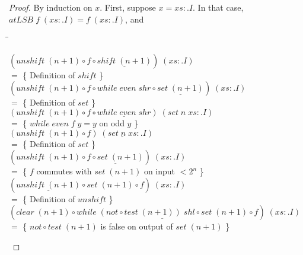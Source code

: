 \documentclass{jfp}
\newcommand{\Conid}[1]{\mathit{#1}}
\newcommand{\Varid}[1]{\mathit{#1}}
\newenvironment{sproof}{%
    \begin{tabbing}
    \phantom{$\equiv$} \= \qquad\qquad\qquad\qquad\qquad \= \kill
}{
    \end{tabbing}
}
\newcommand{\stmt}[1]{\> \ensuremath{#1} \\}
\newcommand{\reason}[2]{\ensuremath{#1} \>\> \{ \quad #2 \quad \} \\}
\theoremstyle{definition}
\theoremstyle{remark}
\begin{document}
\begin{proof}
  By induction on $x$.  First, suppose \ensuremath{\Varid{x}\mathrel{=}\Varid{xs}\mathrel{:\!.}\Conid{I}}.  In that case,
  \ensuremath{\Varid{atLSB}\;\Varid{f}\;(\Varid{xs}\mathrel{:\!.}\Conid{I})\mathrel{=}\Varid{f}\;(\Varid{xs}\mathrel{:\!.}\Conid{I})}, and
  \begin{sproof}
    \stmt{\ensuremath{(\Varid{unshift}\;(\Varid{n}\mathbin{+}\mathrm{1})\mathbin{\circ}\Varid{f}\mathbin{\circ}\underline{\Varid{shift}\;(\Varid{n}\mathbin{+}\mathrm{1})})\;(\Varid{xs}\mathrel{:\!.}\Conid{I})}}
    \reason{=}{Definition of \ensuremath{\Varid{shift}}}
    \stmt{\ensuremath{(\Varid{unshift}\;(\Varid{n}\mathbin{+}\mathrm{1})\mathbin{\circ}\Varid{f}\mathbin{\circ}\Varid{while}\;\Varid{even}\;\Varid{shr}\mathbin{\circ}\underline{\Varid{set}\;(\Varid{n}\mathbin{+}\mathrm{1})})\;(\Varid{xs}\mathrel{:\!.}\Conid{I})}}
    \reason{=}{Definition of \ensuremath{\Varid{set}}}
    \stmt{\ensuremath{(\Varid{unshift}\;(\Varid{n}\mathbin{+}\mathrm{1})\mathbin{\circ}\Varid{f}\mathbin{\circ}\underline{\Varid{while}\;\Varid{even}\;\Varid{shr}})\;(\Varid{set}\;\Varid{n}\;\Varid{xs}\mathrel{:\!.}\Conid{I})}}
    \reason{=}{\ensuremath{\Varid{while}\;\Varid{even}\;\Varid{f}\;\Varid{y}\mathrel{=}\Varid{y}} on odd \ensuremath{\Varid{y}}}
    \stmt{\ensuremath{(\Varid{unshift}\;(\Varid{n}\mathbin{+}\mathrm{1})\mathbin{\circ}\Varid{f})\;(\underline{\Varid{set}\;\Varid{n}\;\Varid{xs}}\mathrel{:\!.}\Conid{I})}}
    \reason{=}{Definition of \ensuremath{\Varid{set}}}
    \stmt{\ensuremath{(\Varid{unshift}\;(\Varid{n}\mathbin{+}\mathrm{1})\mathbin{\circ}\underline{\Varid{f}\mathbin{\circ}\Varid{set}\;(\Varid{n}\mathbin{+}\mathrm{1})})\;(\Varid{xs}\mathrel{:\!.}\Conid{I})}}
    \reason{=}{\ensuremath{\Varid{f}} commutes with \ensuremath{\Varid{set}\;(\Varid{n}\mathbin{+}\mathrm{1})} on input $< 2^n$}
    \stmt{\ensuremath{(\underline{\Varid{unshift}\;(\Varid{n}\mathbin{+}\mathrm{1})}\mathbin{\circ}\Varid{set}\;(\Varid{n}\mathbin{+}\mathrm{1})\mathbin{\circ}\Varid{f})\;(\Varid{xs}\mathrel{:\!.}\Conid{I})}}
    \reason{=}{Definition of \ensuremath{\Varid{unshift}}}
    \stmt{\ensuremath{(\Varid{clear}\;(\Varid{n}\mathbin{+}\mathrm{1})\mathbin{\circ}\underline{\Varid{while}\;(not\mathbin{\circ}\Varid{test}\;(\Varid{n}\mathbin{+}\mathrm{1}))\;\Varid{shl}\mathbin{\circ}\Varid{set}\;(\Varid{n}\mathbin{+}\mathrm{1})}\mathbin{\circ}\Varid{f})\;(\Varid{xs}\mathrel{:\!.}\Conid{I})}}
    \reason{=}{\ensuremath{not\mathbin{\circ}\Varid{test}\;(\Varid{n}\mathbin{+}\mathrm{1})} is false on output of \ensuremath{\Varid{set}\;(\Varid{n}\mathbin{+}\mathrm{1})}}

\end{sproof}
\end{proof}
\end{document}
